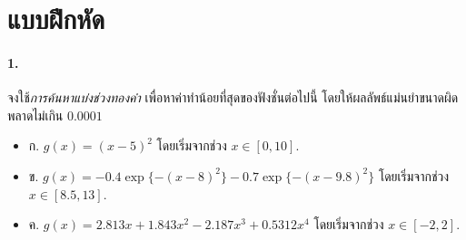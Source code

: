







\section{แบบฝึกหัด}

\paragraph{1.} จงใช้\textit{การค้นหาแบ่งช่วงทองคำ} เพื่อหาค่าทำน้อยที่สุดของฟังชั่นต่อไปนี้
โดยให้ผลลัพธ์แม่นยำขนาดผิดพลาดไม่เกิน $0.0001$

\begin{itemize}
\item ก. $g(x) = (x-5)^2$ โดยเริ่มจากช่วง $x \in [0, 10]$.

\item ข. $g(x) = -0.4 \exp\{-(x-8)^2\}-0.7 \exp\{-(x-9.8)^2\}$ โดยเริ่มจากช่วง $x \in [8.5, 13]$.

\item ค. $g(x) = 2.813 x + 1.843 x^2 -2.187 x^3 + 0.5312 x^4$
โดยเริ่มจากช่วง $x \in [-2, 2]$.
\end{itemize}

